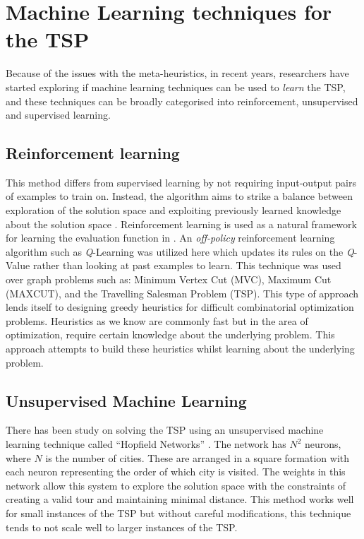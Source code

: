 \documentclass[]{UCD_CS_FYP_Report}
\begin{document}
\section{Machine Learning techniques for the TSP}
Because of the issues with the meta-heuristics, in recent years, researchers have started exploring if machine learning techniques can be used to \emph{learn} the TSP, and these techniques can be broadly categorised into reinforcement, unsupervised and supervised learning. 

\subsection{Reinforcement learning}
This method differs from supervised learning by not requiring input-output pairs of examples to train on. Instead, the algorithm aims to strike a balance between exploration of the solution space and exploiting previously learned knowledge about the solution space \cite{ReinforcementLearning}. Reinforcement learning is used as a natural framework for learning the evaluation function in \cite{DBLP:journals/corr/DaiKZDS17}. An \textit{off-policy} reinforcement learning algorithm such as \textit{Q}-Learning was utilized here which updates its rules on the \textit{Q}-Value rather than looking at past examples to learn. This technique was used over graph problems such as: Minimum Vertex Cut (MVC), Maximum Cut (MAXCUT), and the Travelling Salesman Problem (TSP). This type of approach lends itself to designing greedy heuristics for difficult combinatorial optimization problems. Heuristics as we know are commonly fast but in the area of optimization, require certain knowledge about the underlying problem. This approach attempts to build these heuristics whilst learning about the underlying problem.

\subsection{Unsupervised Machine Learning}
There has been study on solving the TSP using an unsupervised machine learning technique called “Hopfield Networks” \cite{unsupervisedML}. The network has $N^2$ neurons, where $N$ is the number of cities. These are arranged in a square formation with each neuron representing the order of which city is visited. The weights in this network allow this system to explore the solution space with the constraints of creating a valid tour and maintaining minimal distance. This method works well for small instances of the TSP but without careful modifications, this technique tends to not scale well to larger instances of the TSP.
\end{document}
